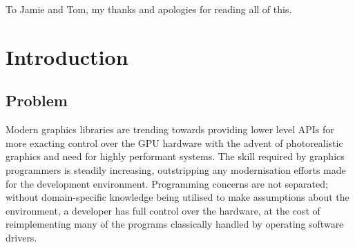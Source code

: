\documentclass[12pt,twoside]{report}
\date{\today}
\begin{document}

\clearpage{\pagestyle{headings}\cleardoublepage}
\setcounter{page}{1}
\pagestyle{fancy}


\begin{abstract}

Abstract here.

\end{abstract}

\clearpage


  To Jamie and Tom, my thanks and apologies for reading all of this.
  
\clearpage



\tableofcontents


\clearpage{\pagestyle{headings}\cleardoublepage}
\setcounter{page}{1}
\fancyhead[LE,RO]{\slshape \rightmark}
\fancyhead[LO,RE]{\slshape \leftmark}



\chapter{Introduction}


\section{Problem} %

Modern graphics libraries are trending towards providing lower level APIs for more exacting control over the GPU hardware with the advent of photorealistic graphics and need for highly performant systems. \autocite{khronosgroup_vulkan_2023} The skill required by graphics programmers is steadily increasing, outstripping any modernisation efforts made for the development environment. Programming concerns are not separated; without domain-specific knowledge being utilised to make assumptions about the environment, a developer has full control over the hardware, at the cost of reimplementing many of the programs classically handled by operating software drivers.
\end{document}
